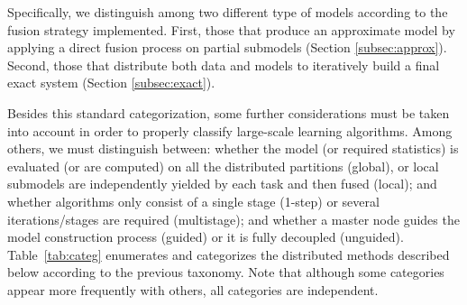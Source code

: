 \documentclass[3p,review]{elsarticle}
\begin{document}
Specifically, we distinguish among two different type of models according to the fusion strategy implemented. First, those that produce an approximate model by applying a direct fusion process on partial submodels (Section \ref{subsec:approx}). Second, those that distribute both data and models to iteratively build a final exact system (Section \ref{subsec:exact}).

Besides this standard categorization, some further considerations must be taken into account in order to properly classify large-scale learning algorithms. Among others, we must distinguish between: whether the model (or required statistics) is evaluated (or are computed) on all the distributed partitions (global), or local submodels are independently yielded by each task and then fused (local); and whether algorithms only consist of a single stage (1-step) or several iterations/stages are required (multistage); and whether a master node guides the model construction process (guided) or it is fully decoupled (unguided). Table~\ref{tab:categ} enumerates and categorizes the distributed methods described below according to the previous taxonomy. Note that although some categories appear more frequently with others, all categories are independent. 


\begin{table}[!htp]
\renewcommand{\arraystretch}{1.3}
\centering
\scriptsize
\caption{Categorization of distributed models for large-scale machine learning. Pseudonym and reference for each method are provided.}
\label{tab:categ}
\end{table}
\end{document}
